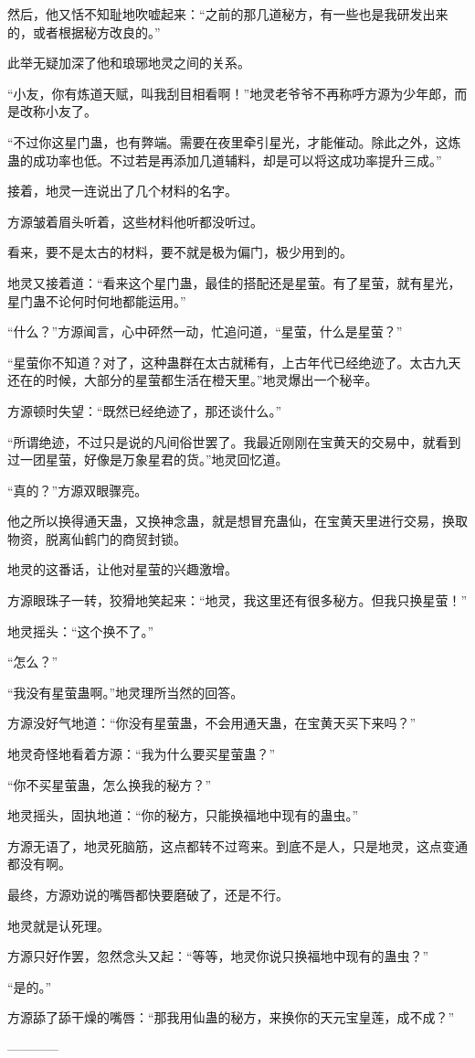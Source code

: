 \begin{this_body}
然后，他又恬不知耻地吹嘘起来：“之前的那几道秘方，有一些也是我研发出来的，或者根据秘方改良的。”

此举无疑加深了他和琅琊地灵之间的关系。

“小友，你有炼道天赋，叫我刮目相看啊！”地灵老爷爷不再称呼方源为少年郎，而是改称小友了。

“不过你这星门蛊，也有弊端。需要在夜里牵引星光，才能催动。除此之外，这炼蛊的成功率也低。不过若是再添加几道辅料，却是可以将这成功率提升三成。”

接着，地灵一连说出了几个材料的名字。

方源皱着眉头听着，这些材料他听都没听过。

看来，要不是太古的材料，要不就是极为偏门，极少用到的。

地灵又接着道：“看来这个星门蛊，最佳的搭配还是星萤。有了星萤，就有星光，星门蛊不论何时何地都能运用。”

“什么？”方源闻言，心中砰然一动，忙追问道，“星萤，什么是星萤？”

“星萤你不知道？对了，这种蛊群在太古就稀有，上古年代已经绝迹了。太古九天还在的时候，大部分的星萤都生活在橙天里。”地灵爆出一个秘辛。

方源顿时失望：“既然已经绝迹了，那还谈什么。”

“所谓绝迹，不过只是说的凡间俗世罢了。我最近刚刚在宝黄天的交易中，就看到过一团星萤，好像是万象星君的货。”地灵回忆道。

“真的？”方源双眼骤亮。

他之所以换得通天蛊，又换神念蛊，就是想冒充蛊仙，在宝黄天里进行交易，换取物资，脱离仙鹤门的商贸封锁。

地灵的这番话，让他对星萤的兴趣激增。

方源眼珠子一转，狡猾地笑起来：“地灵，我这里还有很多秘方。但我只换星萤！”

地灵摇头：“这个换不了。”

“怎么？”

“我没有星萤蛊啊。”地灵理所当然的回答。

方源没好气地道：“你没有星萤蛊，不会用通天蛊，在宝黄天买下来吗？”

地灵奇怪地看着方源：“我为什么要买星萤蛊？”

“你不买星萤蛊，怎么换我的秘方？”

地灵摇头，固执地道：“你的秘方，只能换福地中现有的蛊虫。”

方源无语了，地灵死脑筋，这点都转不过弯来。到底不是人，只是地灵，这点变通都没有啊。

最终，方源劝说的嘴唇都快要磨破了，还是不行。

地灵就是认死理。

方源只好作罢，忽然念头又起：“等等，地灵你说只换福地中现有的蛊虫？”

“是的。”

方源舔了舔干燥的嘴唇：“那我用仙蛊的秘方，来换你的天元宝皇莲，成不成？”

------------

\end{this_body}

